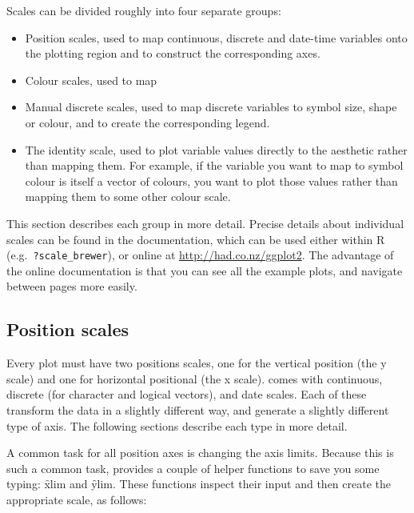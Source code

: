 Scales can be divided roughly into four separate groups:

\begin{itemize}
  \item Position scales, used to map continuous, discrete and date-time variables onto the plotting region and to construct the corresponding axes.

  \item Colour scales, used to map 

  \item Manual discrete scales, used to map discrete variables to symbol size, shape or colour, and to create the corresponding legend.

  \item The identity scale, used to plot variable values directly to the aesthetic rather than mapping them.  For example, if the variable you want to map to symbol colour is itself a vector of colours, you want to plot those values rather than mapping them to some other colour scale.

\end{itemize}

\noindent  This section describes each group in more detail.  Precise details about individual scales can be found in the documentation, which can be used either within R (e.g.\ {\tt ?scale\_brewer}), or online at  \url{http://had.co.nz/ggplot2}.  The advantage of the online documentation is that you can see all the example plots, and navigate between pages more easily.

\subsection{Position scales}
\label{sub:scale-position}

Every plot must have two positions scales, one for the vertical position (the y scale) and one for horizontal positional (the x scale).  \ggplot comes with continuous, discrete (for character and logical vectors), and date scales.  Each of these transform the data in a slightly different way, and generate a slightly different type of axis.  The following sections describe each type in more detail.

A common task for all position axes is changing the axis limits.  Because this is such a common task, \ggplot provides a couple of helper functions to save you some typing: \f{xlim} and \f{ylim}.  These functions inspect their input and then create the appropriate scale, as follows:

